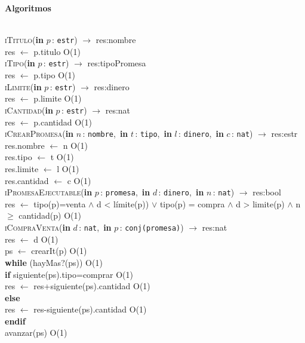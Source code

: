 \documentclass[10pt, a4paper]{article}
\let\NombreFuncion=\textsc
\let\TipoVariable=\texttt
\let\ModificadorArgumento=\textbf
\newcommand{\tab}{\hspace*{7mm}}
\newcommand{\In}[2]{\ModificadorArgumento{in} \ensuremath{#1}\,: \TipoVariable{#2}\xspace}
\newenvironment{Algoritmos}{%
  \vspace*{2ex}%
  \noindent\textbf{\Large Algoritmos}%
  \vspace*{2ex}%
}{}
\begin{document}
\begin{Algoritmos}
\\
\NombreFuncion{iTitulo}(\In{p}{estr}) $\rightarrow$ res:nombre
\\
\tab res $\leftarrow$ p.titulo \hfill O(1)
\\
\NombreFuncion{iTipo}(\In{p}{estr}) $\rightarrow$ res:tipoPromesa
\\
\tab res $\leftarrow$ p.tipo \hfill O(1)
\\
\NombreFuncion{iLimite}(\In{p}{estr}) $\rightarrow$ res:dinero
\\
\tab res $\leftarrow$ p.limite \hfill O(1)
\\
\NombreFuncion{iCantidad}(\In{p}{estr}) $\rightarrow$ res:nat
\\
\tab res $\leftarrow$ p.cantidad \hfill O(1)
\\
\NombreFuncion{iCrearPromesa}(\In{n}{nombre},\ \In{t}{tipo},\ \In{l}{dinero},\ \In{c}{nat}) $\rightarrow$ res:estr
\\
\tab res.nombre $\leftarrow$ n \hfill O(1)
\\
\tab res.tipo $\leftarrow$ t \hfill O(1)
\\
\tab res.limite $\leftarrow$ l \hfill O(1)
\\
\tab res.cantidad $\leftarrow$ c \hfill O(1)
\\
\NombreFuncion{iPromesaEjecutable}(\In{p}{promesa},\ \In{d}{dinero},\ \In{n}{nat}) $\rightarrow$ res:bool
\\
\tab res $\leftarrow$ tipo(p)=venta $\wedge$ d < límite(p)) $\vee$
tipo(p) = compra $\wedge$ d > limite(p) $\wedge$ n $\geq$ cantidad(p) \hfill O(1)
\\
\NombreFuncion{iCompraVenta}(\In{d}{nat},\ \In{p}{conj(promesa)}) $\rightarrow$ res:nat
\\
\tab res $\leftarrow$ d \hfill O(1)
\\
\tab ps $\leftarrow$ crearIt(p) \hfill O(1)
\\
\tab \textbf{while} (hayMas?(ps)) \hfill O(1)
\\
\tab \tab \textbf{if} siguiente(ps).tipo=comprar \hfill O(1)
\\
\tab \tab \tab res $\leftarrow$ res+siguiente(ps).cantidad \hfill O(1)
\\
\tab \tab \textbf{else}
\\
\tab \tab \tab res $\leftarrow$ res-siguiente(ps).cantidad \hfill O(1)
\\
\tab \tab \textbf{endif}
\\
\tab \tab avanzar(ps) \hfill O(1)

\end{Algoritmos}
\end{document}
